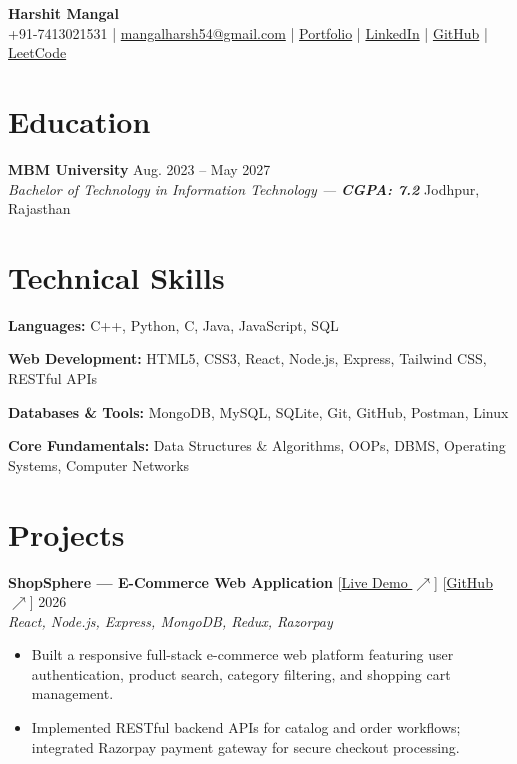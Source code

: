 \documentclass[10pt,a4paper]{article}
\newcommand{\resumeSubheading}[4]{%
    \par\vspace{3pt}%
    \textbf{\color{primary}#1} \hfill {\small\color{textgray}#2}\\
    \textit{\color{textgray}#3} \hfill {\small\color{textgray}#4}\par\vspace{2pt}%
}
\newcommand{\resumeProject}[4]{%
    \par\vspace{4pt}%
    \textbf{\color{primary}#1} \hspace{4pt} {\footnotesize\color{accent}#2} \hfill {\small\color{textgray}#3}\\
    \textit{\footnotesize\color{textgray}#4}\par\vspace{2pt}%
}
\begin{document}
\begin{center}
    {\huge \textbf{\color{primary}Harshit Mangal}} \\[4pt]
    \small
    +91-7413021531 \;|\;
    \href{mailto:mangalharsh54@gmail.com}{\color{accent}mangalharsh54@gmail.com}
    \;|\;
    \href{https://harshitmangal.github.io/portfolio/}{\color{accent}Portfolio}
    \;|\;
    \href{https://linkedin.com/in/harshit-mangal}{\color{accent}LinkedIn}
    \;|\;
    \href{https://github.com/HarshitMangal}{\color{accent}GitHub}
    \;|\;
    \href{https://leetcode.com/u/Harshit_mangal/}{\color{accent}LeetCode}
\end{center}

\vspace{-6pt}

\section*{Education}
\resumeSubheading
{MBM University}{Aug. 2023 -- May 2027}
{Bachelor of Technology in Information Technology --- \textbf{CGPA: 7.2}}{Jodhpur, Rajasthan}

\section*{Technical Skills}
\par\vspace{2pt}
\textbf{Languages:} C++, Python, C, Java, JavaScript, SQL \par\vspace{2.5pt}
\textbf{Web Development:} HTML5, CSS3, React, Node.js, Express, Tailwind CSS, RESTful APIs \par\vspace{2.5pt}
\textbf{Databases \& Tools:} MongoDB, MySQL, SQLite, Git, GitHub, Postman, Linux \par\vspace{2.5pt}
\textbf{Core Fundamentals:} Data Structures \& Algorithms, OOPs, DBMS, Operating Systems, Computer Networks

\section*{Projects}

\resumeProject
{ShopSphere --- E-Commerce Web Application}
{[\href{https://flipcart-clone-mu.vercel.app}{Live Demo $\nearrow$}] [\href{https://github.com/HarshitMangal/Flipcart-Clone}{GitHub $\nearrow$}]}
{2026}
{React, Node.js, Express, MongoDB, Redux, Razorpay}
\begin{itemize}
    \item Built a responsive full-stack e-commerce web platform featuring user authentication, product search, category filtering, and shopping cart management.
    \item Implemented RESTful backend APIs for catalog and order workflows; integrated Razorpay payment gateway for secure checkout processing.
\end{itemize}
\end{document}
